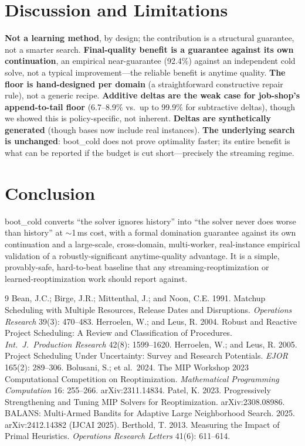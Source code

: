 \documentclass[11pt]{article}                        %
\begin{document}
\section{Discussion and Limitations}
\label{sec:limitations}

\textbf{Not a learning method}, by design; the contribution is a structural
guarantee, not a smarter search. \textbf{Final-quality benefit is a guarantee
against its own continuation}, an empirical near-guarantee (92.4\%) against an
independent cold solve, not a typical improvement---the reliable benefit is
anytime quality. \textbf{The floor is hand-designed per domain} (a
straightforward constructive repair rule), not a generic recipe.
\textbf{Additive deltas are the weak case for job-shop's append-to-tail floor}
(6.7--8.9\% vs.\ up to 99.9\% for subtractive deltas), though we showed this is
policy-specific, not inherent. \textbf{Deltas are synthetically generated}
(though bases now include real instances). \textbf{The underlying search is
unchanged}: boot\_cold does not prove optimality faster; its entire benefit is
what can be reported if the budget is cut short---precisely the streaming
regime.

\section{Conclusion}
boot\_cold converts ``the solver ignores history'' into ``the solver never does
worse than history'' at $\sim$1\,ms cost, with a formal domination guarantee
against its own continuation and a large-scale, cross-domain, multi-worker,
real-instance empirical validation of a robustly-significant anytime-quality
advantage. It is a simple, provably-safe, hard-to-beat baseline that any
streaming-reoptimization or learned-reoptimization work should report against.

\begin{thebibliography}{9}
\small
{} Bean, J.C.; Birge, J.R.; Mittenthal, J.; and Noon, C.E.
1991. Matchup Scheduling with Multiple Resources, Release Dates and
Disruptions. \emph{Operations Research} 39(3): 470--483.
 Herroelen, W.; and Leus, R. 2004. Robust and Reactive
Project Scheduling: A Review and Classification of Procedures.
\emph{Int.\ J.\ Production Research} 42(8): 1599--1620.
 Herroelen, W.; and Leus, R. 2005. Project Scheduling
Under Uncertainty: Survey and Research Potentials. \emph{EJOR} 165(2):
289--306.
 Bolusani, S.; et al.\ 2024. The MIP Workshop 2023
Computational Competition on Reoptimization. \emph{Mathematical Programming
Computation} 16: 255--266. arXiv:2311.14834.
 Patel, K. 2023. Progressively Strengthening and Tuning MIP
Solvers for Reoptimization. arXiv:2308.08986.
 BALANS: Multi-Armed Bandits for Adaptive Large
Neighborhood Search. 2025. arXiv:2412.14382 (IJCAI 2025).
 Berthold, T. 2013. Measuring the Impact of Primal
Heuristics. \emph{Operations Research Letters} 41(6): 611--614.
\end{thebibliography}
\end{document}
